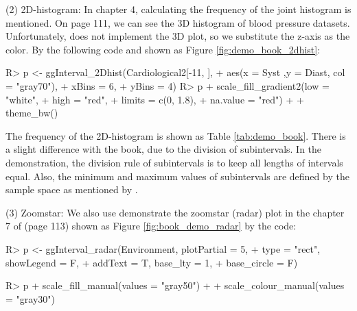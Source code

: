 \documentclass[article]{jss}
\begin{document}
(2) 2D-histogram: In chapter 4, calculating the frequency of the joint histogram is mentioned. On page 111, we can see the 3D histogram of blood pressure datasets. Unfortunately,  does not implement the 3D plot, so we substitute the z-axis as the color. By the following code and shown as Figure \ref{fig:demo_book_2dhist}:
\begin{CodeChunk}
\begin{CodeInput}
R> p <- ggInterval_2Dhist(Cardiological2[-11, ], 
+                       aes(x = Syst ,y = Diast, col = "gray70"),
+                       xBins = 6,
+                       yBins = 4)
R> p + scale_fill_gradient2(low = "white",
+                         high = "red",
+                         limits = c(0, 1.8),
+                         na.value = "red") +
+      theme_bw()
\end{CodeInput}
\end{CodeChunk}

The frequency of the 2D-histogram is shown as Table \ref{tab:demo_book}. There is a slight difference with the book, due to the division of subintervals. In the demonstration, the division rule of subintervals is to keep all lengths of intervals equal. Also, the minimum and maximum values of subintervals are defined by the sample space as mentioned by \cite{billard:2006}.

(3) Zoomstar: We also use  demonstrate the zoomstar (radar) plot in the chapter 7 of \cite{diday:2008} (page 113) shown as Figure \ref{fig:book_demo_radar} by the code:
\begin{CodeChunk}
\begin{CodeInput}
R> p <- ggInterval_radar(Environment, plotPartial = 5,
+                        type = "rect", showLegend = F,
+                        addText = T, base_lty = 1,
+                        base_circle = F)

R> p + scale_fill_manual(values = "gray50") +
+      scale_colour_manual(values = "gray30")

\end{CodeInput}
\end{CodeChunk}
\end{document}
